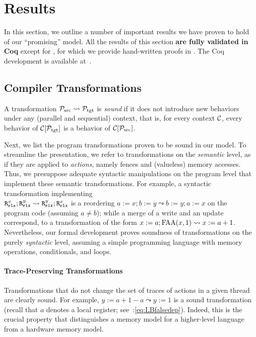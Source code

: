 \section{Results}
\label{sec:results}

In this section, we outline a number of important results we have proven to hold of our
``promising'' model.
%
%
All the results of this section \textbf{are fully validated in Coq} except
for %
, for which we provide hand-written proofs in .
The {Coq} development is available at~\cite{kang-phd-thesis-web}.

\subsection{Compiler Transformations}
\label{sec:transformations}

A transformation $\mathcal{P}_\text{src} \leadsto \mathcal{P}_\text{tgt}$ is \emph{sound} 
if it does not introduce new behaviors under any (parallel and sequential) context, that is, 
for every context ${\cal C}$,
every behavior of ${\cal C}[\mathcal{P}_\text{tgt}]$ is a behavior of ${\cal C}[\mathcal{P}_\text{src}]$.

Next, we list the program transformations proven to be sound in our model.
To streamline the presentation, we refer to transformations on the \emph{semantic} level, 
as if they are applied to \emph{actions}, namely fences and (valueless) memory accesses.
Thus, we presuppose adequate syntactic manipulations on the program level
that implement these semantic transformations.
For example, a syntactic transformation implementing \\
${\texttt{R}^x_{\texttt{rlx}};\texttt{R}^y_{\texttt{rlx}} \leadsto \texttt{R}^y_{\texttt{rlx}};\texttt{R}^x_{\texttt{rlx}}}$
is a reordering ${a:=x; b:=y \leadsto b:=y; a:=x}$
on the program code (assuming $a \neq b$);
while a merge of a write and an update correspond, \eg  to a transformation
of the form $x:=a;\textrm{FAA}({x,1})  \leadsto  x:=a+1$.
Nevertheless, our formal development
proves soundness of transformations on the purely \emph{syntactic} level, assuming a simple programming language with memory operations, conditionals, and loops.



\paragraph{Trace-Preserving Transformations}
Transformations that do not change the set of traces of actions in a given thread are clearly sound.
For example, $y:=a+1-a \leadsto y:=1$ is a sound transformation (recall that $a$ denotes a local register; see~:\ref{eq:LBfalsedep}).
Indeed, this is the crucial property that distinguishes a memory model for a higher-level language from
a hardware memory model.

